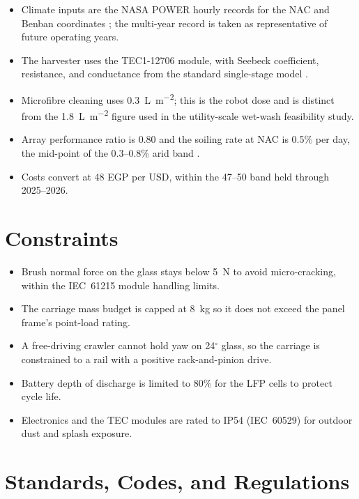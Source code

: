 \documentclass[12pt,a4paper]{report}   %
\begin{document}
\begin{itemize}[leftmargin=*]
  \item Climate inputs are the NASA POWER hourly records for the NAC and Benban
  coordinates \cite{nasa_power}; the multi-year record is taken as representative of
  future operating years.
  \item The harvester uses the TEC1-12706 module, with Seebeck coefficient, resistance,
  and conductance from the standard single-stage model \cite{zhao2022teccondenser,riffat2003peltier}.
  \item Microfibre cleaning uses \SI{0.3}{\liter\per\metre\squared}; this is the robot
  dose and is distinct from the \SI{1.8}{\liter\per\metre\squared} figure used in the
  utility-scale wet-wash feasibility study.
  \item Array performance ratio is 0.80 and the soiling rate at NAC is 0.5\% per day,
  the mid-point of the 0.3--0.8\% arid band \cite{kazem2023soiling}.
  \item Costs convert at \SI{48}{} EGP per USD, within the 47--50 band held through
  2025--2026.
\end{itemize}

\section{Constraints}

\begin{itemize}[leftmargin=*]
  \item Brush normal force on the glass stays below \SI{5}{\newton} to avoid
  micro-cracking, within the IEC~61215 module handling limits.
  \item The carriage mass budget is capped at \SI{8}{\kilo\gram} so it does not exceed
  the panel frame's point-load rating.
  \item A free-driving crawler cannot hold yaw on 24$^\circ$ glass, so the carriage is
  constrained to a rail with a positive rack-and-pinion drive.
  \item Battery depth of discharge is limited to 80\% for the LFP cells to protect
  cycle life.
  \item Electronics and the TEC modules are rated to IP54 (IEC~60529) for outdoor dust
  and splash exposure.
\end{itemize}

\section{Standards, Codes, and Regulations}
\end{document}
